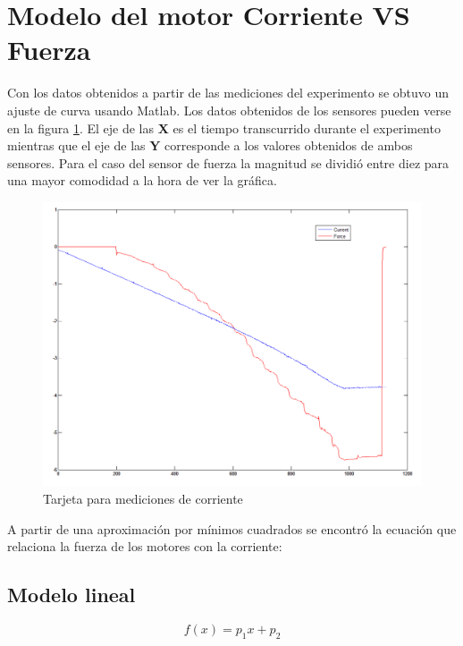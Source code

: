 \newpage
\section{Modelo del motor Corriente VS Fuerza}
Con los datos obtenidos a partir de las mediciones del experimento se obtuvo un ajuste de curva usando Matlab. Los datos obtenidos de los sensores pueden verse en la figura \ref{fig:MedicionesFuerzaCorriente}. El eje de las \textbf{X} es el tiempo transcurrido durante el experimento mientras que el eje de las \textbf{Y} corresponde a los valores obtenidos de ambos sensores. Para el caso del sensor de fuerza la magnitud se dividió entre diez para una mayor comodidad a la hora de ver la gráfica.




\begin{figure}[htb!]
\centering
\includegraphics[scale=0.4]{FiguresP/ForceCurrent}
\caption{Tarjeta para mediciones de corriente}
\label{fig:MedicionesFuerzaCorriente}
\end{figure}


A partir de una aproximación por mínimos cuadrados se encontró la ecuación que relaciona la fuerza de los motores con la corriente:

\subsection*{Modelo lineal}

\begin{equation}
f(x) = p_1x + p_2
\end{equation}
     
